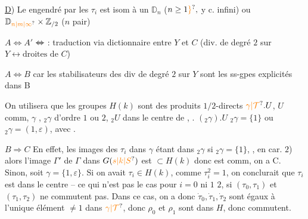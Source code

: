 \uline{D}) Le  engendré par les $\tau_i$ est
isom à un $\mathbb D_n$ ($n\geq1\unsure{\}},$ y c. infini) ou $\mathbb D_{\unsure{n|m|\infty}}\times\mathbb Z_{/2}$ ($n$ pair)

$A\Leftrightarrow A'$ $\deleted{\Leftrightarrow}$ : traduction via dictionnaire entre $Y$ et $C$ (div. de degré
$2$ sur $Y\longleftrightarrow\text{droites de }C$)

$A\Longleftrightarrow B$ car les stabilisateurs des div de degré $2$ sur $Y$
sont les ss-gpes explicités dans B

On utilisera que les groupes $H(k)$ sont des produits
$1/2$-directs $\unsure{\gamma|\mathcal T}.U$, $U$ comm, $\gamma$ ,
$ {}_2\gamma$ d'ordre $1$ ou $2$,  $ {}_2U$ dans le centre de ,
. $({}_2\gamma).U$  $ {}_2\gamma=\{1\}$ ou $ {}_2\gamma=(1,\varepsilon)$, avec .

$B\Longrightarrow C$ \qquad En effet,  les images des $\tau_i$ dans
$\gamma$ étant dans $ {}_2\gamma$  si $ {}_2\gamma=\{1\}$, ,
en car. $2$) alors l'image $\Gamma'$ de $\Gamma$ dans $G(\unsure{s|k|S})$
est $\subset H(k)$ donc est comm, on a C.
Sinon, soit $\gamma=\{1,\varepsilon\}$. Si 
on avait $\tau_i\in H(k)$, comme $\tau_i^2=1$, on
conclurait que $\tau_i$ est dans le centre -- ce qui
n'est pas le cas pour  $i=0$ ni $1$  $2$, si $(\tau_0,\tau_1)$ et
$(\tau_1,\tau_2)$ ne commutent pas. Dans ce cas, on a
donc $\dot\tau_0,\dot\tau_1,\dot\tau_2$ sont égaux à l'unique élément $\ne1$
dans $\unsure{\gamma|\mathcal T}$, donc $\rho_0$ et $\rho_1$ sont dans $H$, donc
commutent. \unsure{$=$}

